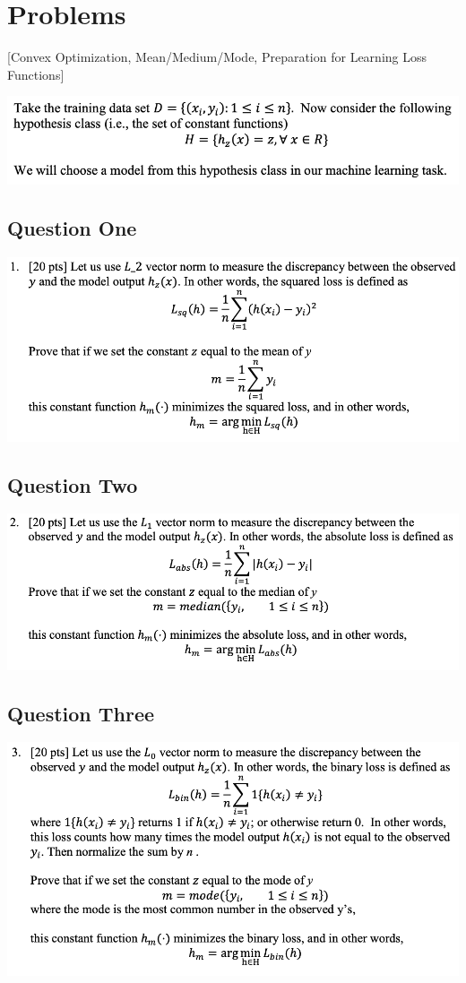 \section{Problems}

[Convex Optimization, Mean/Medium/Mode, Preparation for Learning Loss Functions]

\includegraphics[width=1\textwidth]{media/problems_intro.png}

\subsection{Question One}
\includegraphics[width=1\textwidth]{media/q1.png}

\subsection{Question Two}
\includegraphics[width=1\textwidth]{media/q2.png}

\subsection{Question Three}
\includegraphics[width=1\textwidth]{media/q3.png}
